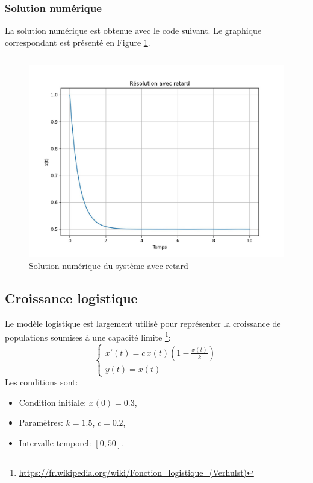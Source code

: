             \subsubsection{Solution numérique}
                La solution numérique est obtenue avec le code suivant. Le graphique correspondant est présenté en Figure \ref{fig:retard}. 
                \inputminted{python}{codes/retard.py}
                \begin{figure}[ht!]
                    \centering
                    \includegraphics[width=\textwidth]{images/retard.jpg}
                    \caption{Solution numérique du système avec retard}
                    \label{fig:retard}
                \end{figure}

        \subsection{Croissance logistique}
            Le modèle logistique est largement utilisé pour représenter la croissance de populations soumises à une capacité limite \footnote{\url{https://fr.wikipedia.org/wiki/Fonction_logistique_(Verhulst)}}:
            \begin{equation*}
            \begin{cases}
            x'(t)=c\,x(t)\left(1-\frac{x(t)}{k}\right)\\
            y(t)=x(t)
            \end{cases}
            \end{equation*}
            Les conditions sont:
            \begin{itemize}
                \item Condition initiale: $x(0)=0.3$,
                \item Paramètres: $k=1.5$, $c=0.2$,
                \item Intervalle temporel: $[0,50]$.
            \end{itemize}
        
